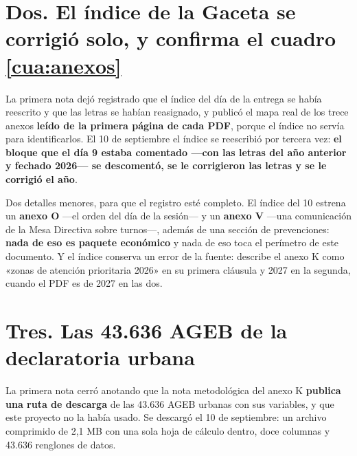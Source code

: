 \section*{Dos. El índice de la Gaceta se corrigió solo, y confirma el cuadro \ref{cua:anexos}}

La primera nota dejó registrado que el índice del día de la entrega se había reescrito y que
las letras se habían reasignado, y publicó el mapa real de los trece anexos \textbf{leído de
la primera página de cada PDF}, porque el índice no servía para identificarlos. El 10 de
septiembre el índice se reescribió por tercera vez: \textbf{el bloque que el día 9 estaba
comentado ---con las letras del año anterior y fechado 2026--- se descomentó, se le
corrigieron las letras y se le corrigió el año}.




Dos detalles menores, para que el registro esté completo. El índice del 10 estrena un
\textbf{anexo O} ---el orden del día de la sesión--- y un \textbf{anexo V} ---una
comunicación de la Mesa Directiva sobre turnos---, además de una sección de prevenciones:
\textbf{nada de eso es paquete económico} y nada de eso toca el perímetro de este documento.
Y el índice conserva un error de la fuente: describe el anexo K como «zonas de atención
prioritaria 2026» en su primera cláusula y 2027 en la segunda, cuando el PDF es de 2027 en
las dos.

\section*{Tres. Las 43.636 AGEB de la declaratoria urbana}

La primera nota cerró anotando que la nota metodológica del anexo K \textbf{publica una ruta
de descarga} de las 43.636 AGEB urbanas con sus variables, y que este proyecto no la había
usado. Se descargó el 10 de septiembre: un archivo comprimido de 2,1 MB con una sola hoja de
cálculo dentro, doce columnas y 43.636 renglones de datos.

